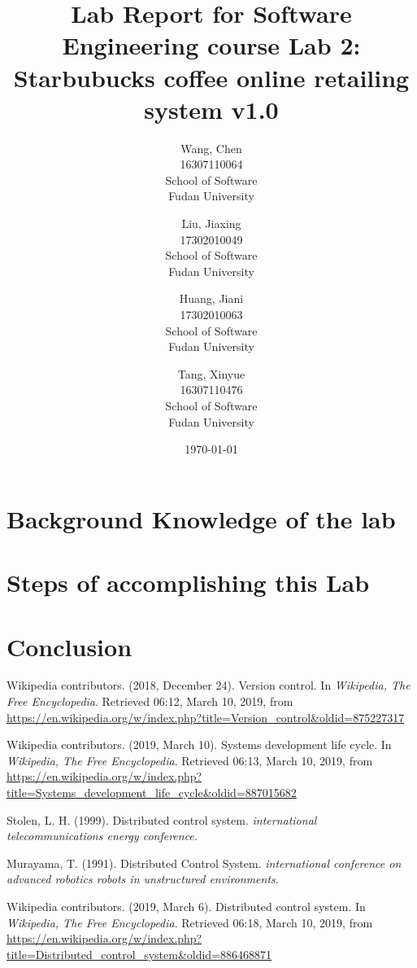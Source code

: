 \documentclass[a4paper]{report}
\title{Lab Report for Software Engineering course \newline
 Lab 2: Starbubucks coffee online retailing system v1.0}
\author{Wang, Chen \\ 16307110064 \\ School of Software\\ Fudan University}
\author{Liu, Jiaxing\\17302010049 \\ School of Software\\ Fudan University}
\author{Huang, Jiani\\17302010063\\School of Software\\ Fudan University}
\author{Tang, Xinyue\\16307110476\\School of Software\\ Fudan University}
\date{\today}
\begin{document}
\maketitle

\tableofcontents

\chapter{Background Knowledge of the lab}



\chapter{Steps of accomplishing this Lab}



\chapter{Conclusion}

\begin{thebibliography}{A}

Wikipedia contributors. (2018, December 24). Version control. In \emph{Wikipedia, The Free Encyclopedia}. Retrieved 06:12, March 10, 2019, from \url{https://en.wikipedia.org/w/index.php?title=Version_control&oldid=875227317}

Wikipedia contributors. (2019, March 10). Systems development life cycle. In \emph{Wikipedia, The Free Encyclopedia}. Retrieved 06:13, March 10, 2019, from \url{https://en.wikipedia.org/w/index.php?title=Systems_development_life_cycle&oldid=887015682}

Stolen, L. H. (1999). Distributed control system. \emph{international telecommunications energy conference.}

Murayama, T. (1991). Distributed Control System. \emph{international conference on advanced robotics robots in unstructured environments}.

Wikipedia contributors. (2019, March 6). Distributed control system. In \emph{Wikipedia, The Free Encyclopedia}. Retrieved 06:18, March 10, 2019, from \url{https://en.wikipedia.org/w/index.php?title=Distributed_control_system&oldid=886468871}

\end{thebibliography}
\end{document}
